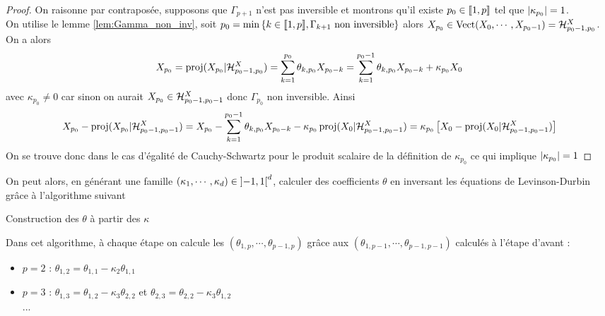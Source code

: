 \documentclass{report}
\begin{document}
\begin{proof}
On raisonne par contraposée, supposons que $\Gamma_{p+1}$ n'est pas inversible et montrons qu'il existe $p_0\in {\left\llbracket 1,p \right\rrbracket}$ tel que ${ \left| \kappa_{p_0} \right|} = 1$. \\
On utilise le lemme \ref{lem:Gamma_non_inv}, soit $p_0 = \min{ \left\lbrace k \in {\left\llbracket 1,p \right\rrbracket}, \Gamma_{k+1} \mbox{ non inversible} \right\rbrace }$ alors $X_{p_0} \in \mathop{\rm Vect}\nolimits(X_0,\cdots,X_{p_0-1}) = \mathcal{H}^X_{p_0-1,p_0}$.
On a alors
$$
X_{p_0} = \mathop{\rm proj}\nolimits(X_{p_0}|\mathcal{H}^X_{p_0-1,p_0}) = \sum_{k=1}^{p_0} \theta_{k,p_0} X_{p_0-k} = \sum_{k=1}^{p_0-1} \theta_{k,p_0} X_{p_0-k} + \kappa_{p_0} X_0
$$
avec $\kappa_{p_0} \neq 0$ car sinon on aurait $X_{p_0} \in \mathcal{H}^X_{p_0-1,p_0-1}$ donc $\Gamma_{p_0}$ non inversible. Ainsi
$$
X_{p_0} - \mathop{\rm proj}\nolimits(X_{p_0}|\mathcal{H}^X_{p_0-1,p_0-1}) = X_{p_0} - \sum_{k=1}^{p_0-1} \theta_{k,p_0} X_{p_0-k} - \kappa_{p_0} \mathop{\rm proj}\nolimits(X_0|\mathcal{H}^X_{p_0-1,p_0-1}) = \kappa_{p_0} \left[ X_0 - \mathop{\rm proj}\nolimits(X_0|\mathcal{H}^X_{p_0-1,p_0-1}) \right]
$$
On se trouve donc dans le cas d'égalité de Cauchy-Schwartz pour le produit scalaire de la définition de $\kappa_{p_0}$ ce qui implique ${ \left| \kappa_{p_0} \right|} = 1$
\end{proof}
On peut alors, en générant une famille $(\kappa_1, \cdots , \kappa_d) \in {\left] -1,1 \right[}^d$, calculer des coefficients $\theta$ en inversant les équations de Levinson-Durbin grâce à l'algorithme suivant \\
\begin{algorithm}[H]
 \caption{Construction des $\theta$ à partir  des $\kappa$}
 \label{algo:construction}
\end{algorithm}
\begin{Rque}
Dans cet algorithme, à chaque étape on calcule les $(\theta_{1,p}, \cdots, \theta_{p-1,p})$ grâce aux $(\theta_{1,p-1}, \cdots, \theta_{p-1,p-1})$ calculés à l'étape d'avant :
\begin{itemize}
\item $p=2$ : $\theta_{1,2} = \theta_{1,1} - \kappa_2 \theta_{1,1}$
\item $p=3$ : $\theta_{1,3} = \theta_{1,2} - \kappa_3 \theta_{2,2}$ et $\theta_{2,3} = \theta_{2,2} - \kappa_3 \theta_{1,2}$\\
...
\end{itemize} 
\end{Rque}
\end{document}
